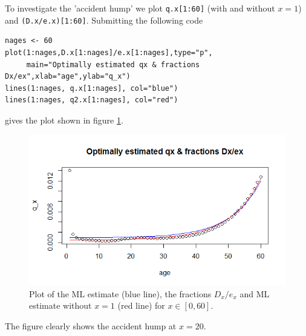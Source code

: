 To investigate the 'accident hump' we plot \verb+q.x[1:60]+ (with and without $x=1$) and \verb+(D.x/e.x)[1:60]+. Submitting the following code

\begin{verbatim}
nages <- 60
plot(1:nages,D.x[1:nages]/e.x[1:nages],type="p",
     main="Optimally estimated qx & fractions Dx/ex",xlab="age",ylab="q_x")
lines(1:nages, q.x[1:nages], col="blue")
lines(1:nages, q2.x[1:nages], col="red")
\end{verbatim}

gives the plot shown in figure \ref{Figure_Question9_3}.
\begin{center}
\begin{figure}[H]
\includegraphics[scale=1]{Question_9_MakehamGompertz_3.png}
\caption{Plot of the ML estimate (blue line), the fractions $D_x/e_x$ and ML estimate without $x=1$ (red line) for $ x \in [0,60]$.}
\label{Figure_Question9_3}
\end{figure}
\end{center}		

The figure clearly shows the accident hump at $x=20$. 

